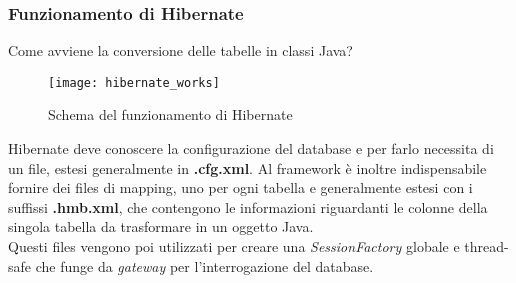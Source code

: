 \subsubsection{Funzionamento di Hibernate} %
Come avviene la conversione delle tabelle in classi Java?\\
\begin{figure}[h]
	\centering
	\texttt{[image: hibernate\_works]}
	\caption{Schema del funzionamento di Hibernate}
	\label{schema-generale}
\end{figure}
 Hibernate deve conoscere la configurazione del database e per farlo necessita di un file, estesi generalmente in \textbf{.cfg.xml}. Al framework è inoltre indispensabile fornire dei files di mapping, uno per ogni tabella e generalmente estesi con i suffissi \textbf{.hmb.xml}, che contengono le informazioni riguardanti le colonne della singola tabella da trasformare in un oggetto Java.\\
Questi files vengono poi utilizzati per creare una \emph{SessionFactory} globale e thread-safe che funge da \emph{gateway} per l'interrogazione del database.